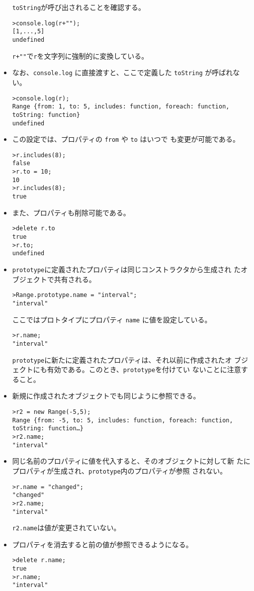 \begin{Exec}
\begin{itemize}
       \texttt{toString}が呼び出されることを確認する。
\begin{verbatim}
>console.log(r+"");
[1,...,5]
undefined
\end{verbatim}
\texttt{r+""}で\texttt{r}を文字列に強制的に変換している。
 \item なお、\texttt{console.log} に直接渡すと、ここで定義した
       \texttt{toString} が呼ばれない。
\begin{verbatim}
>console.log(r);
Range {from: 1, to: 5, includes: function, foreach: function, toString: function}
undefined
\end{verbatim}
 \item この設定では、プロパティの \texttt{from} や \texttt{to} はいつで
       も変更が可能である。
\begin{verbatim}
>r.includes(8);
false
>r.to = 10;
10
>r.includes(8);
true
\end{verbatim}
 \item また、プロパティも削除可能である。
\begin{verbatim}
>delete r.to
true
>r.to;
undefined
\end{verbatim}
 \item \texttt{prototype}に定義されたプロパティは同じコンストラクタから生成され
たオブジェクトで共有される。
\begin{verbatim}
>Range.prototype.name = "interval";
"interval"
\end{verbatim}
ここではプロトタイプにプロパティ \texttt{name} に値を設定している。
\begin{verbatim}
>r.name;
"interval"
\end{verbatim}
\texttt{prototype}に新たに定義されたプロパティは、それ以前に作成されたオ
       ブジェクトにも有効である。このとき、\texttt{prototype}を付けてい
       ないことに注意すること。
 \item 新規に作成されたオブジェクトでも同じように参照できる。
\begin{verbatim}
>r2 = new Range(-5,5);
Range {from: -5, to: 5, includes: function, foreach: function, toString: function…}
>r2.name;
"interval"
\end{verbatim}
 \item 同じ名前のプロパティに値を代入すると、そのオブジェクトに対して新
       たにプロパティが生成され、\texttt{prototype}内のプロパティが参照
       されない。
\begin{verbatim}
>r.name = "changed";
"changed"
>r2.name;
"interval"
\end{verbatim}
\texttt{r2.name}は値が変更されていない。
 \item プロパティを消去すると前の値が参照できるようになる。
\begin{verbatim}
>delete r.name;
true
>r.name;
"interval"
\end{verbatim}
\end{itemize}
\end{Exec}
